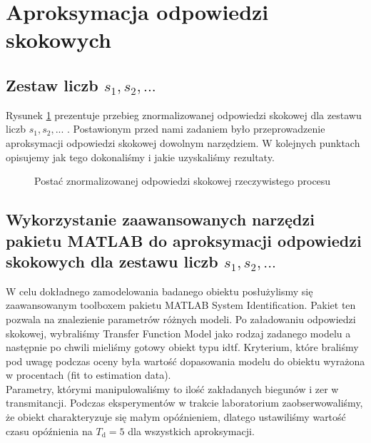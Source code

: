 \section{Aproksymacja odpowiedzi skokowych}
\label{zad3_lab_opis}
\subsection{Zestaw liczb \texorpdfstring{$s_{1}, s_{2}, ...$ }{TEXT} }
Rysunek \ref{lab3_odp_skok_s} prezentuje przebieg znormalizowanej odpowiedzi skokowej dla zestawu liczb $s_{1}, s_{2}, ...$ . Postawionym przed nami zadaniem było przeprowadzenie aproksymacji odpowiedzi skokowej dowolnym narzędziem. W kolejnych punktach opisujemy jak tego dokonaliśmy i jakie uzyskaliśmy rezultaty. 
\begin{figure}[b]
    \centering
    \caption{Postać znormalizowanej odpowiedzi skokowej rzeczywistego procesu}
    \label{lab3_odp_skok_s}
\end{figure}
\FloatBarrier

\subsection{Wykorzystanie zaawansowanych narzędzi pakietu MATLAB do aproksymacji odpowiedzi skokowych dla zestawu liczb \texorpdfstring{$s_{1}, s_{2}, ...$ }{TEXT}}
W celu dokładnego zamodelowania badanego obiektu posłużylismy
się zaawansowanym toolboxem pakietu MATLAB System Identification.
Pakiet ten pozwala na znalezienie parametrów różnych modeli. Po załadowaniu
odpowiedzi skokowej, wybraliśmy Transfer Function Model jako rodzaj zadanego
modelu a następnie po chwili mieliśmy gotowy obiekt typu idtf. Kryterium, które braliśmy pod uwagę podczas oceny była wartość dopasowania modelu do obiektu wyrażona w procentach (fit to estimation data). \\
\indent Parametry, którymi manipulowaliśmy to ilość zakładanych biegunów i zer w transmitancji. Podczas eksperymentów w trakcie laboratorium zaobserwowaliśmy, że obiekt charakteryzuje się małym opóźnieniem, dlatego ustawiliśmy wartość czasu opóźnienia na $T_{\mathrm{d}}=5$ dla wszystkich aproksymacji. 
\\
